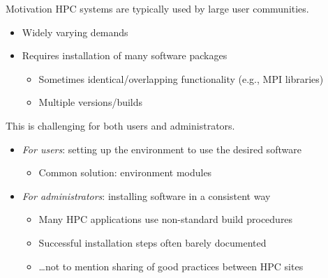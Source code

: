 \documentclass[10pt,xcolor={usenames,dvipsnames}]{beamer}
\begin{document}
\begin{frame}{Motivation}
    HPC systems are typically used by large user communities.
    \begin{itemize}
        \item
            Widely varying demands
        \item
            Requires installation of many software packages
            \begin{itemize}
                \item
                    Sometimes identical/overlapping functionality (e.g., MPI libraries)
                \item
                    Multiple versions/builds
            \end{itemize}
    \end{itemize}
    \medskip
    This is challenging for both users and administrators.
    \begin{itemize}
        \item
            \emph{For users}: setting up the environment to use the desired software
            \begin{itemize}
                \item
                    Common solution: environment modules
            \end{itemize}
        \item
            \emph{For administrators}: installing software in a consistent way
            \begin{itemize}
                \item
                    Many HPC applications use non-standard build procedures
                \item
                    Successful installation steps often barely documented
                \item
                    \ldots not to mention sharing of good practices between HPC sites
            \end{itemize}
    \end{itemize}
\end{frame}

\end{document}
